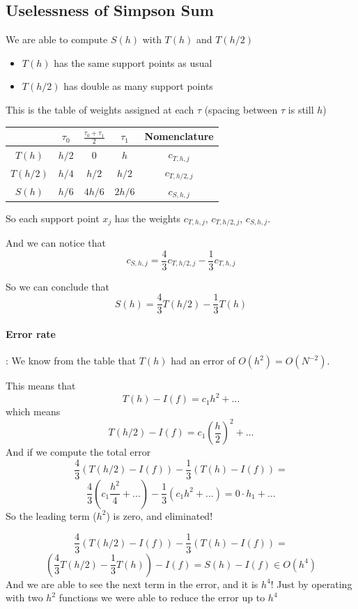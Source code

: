 \documentclass{article}
\begin{document}
\subsection{Uselessness of Simpson Sum}
We are able to compute $S(h)$ with $T(h)$ and $T(h/2)$

\begin{itemize}
  \item $T(h)$ has the same support points as usual
  \item $T(h/2)$ has double as many support points
\end{itemize}
This is the table of weights assigned at each $\tau$ (spacing between $\tau$ is still $h$)
\begin{center}
  \begin{tabular}{|c|c|c|c|c|}
    \hline
     & $\tau_0$ & $\frac{\tau_0 + \tau_1}{2}$ & $\tau_1$ & Nomenclature\\
    \hline
    $T(h)$ & $h/2$ & 0 & $h$ & $c_{T,h,j}$\\
    \hline
    $T(h/2)$ & $h/4$ & $h/2$ & $h/2$ & $c_{T,h/2,j}$ \\
    \hline
    $S(h)$ & $h/6$ & $4h/6$ & $2h/6$ & $c_{S,h,j}$\\
    \hline
  \end{tabular}
\end{center}
So each support point $x_j$ has the weights $c_{T,h,j}$, $c_{T,h/2,j}$, $c_{S,h,j}$.

And we can notice that
\[c_{S,h,j} = \frac{4}{3}c_ {T,h/2,j} - \frac{1}{3}c_{T,h,j}\]


So we can conclude that
\[S(h) = \frac{4}{3}T(h/2) - \frac{1}{3}T(h)\]
\paragraph{Error rate}: We know from the table that $T(h)$ had an error of $O(h^2) = O(N^{-2})$.

This means that
\[T(h)-I(f) = c_1 h^2 + \dots\]
which means
\[T(h/2) - I(f) = c_1 \left(\frac{h}{2}\right)^2 + \dots\]
And if we compute the total error
\[\frac{4}{3}\left(T(h/2) - I(f)\right) - \frac{1}{3}\left(T(h) - I(f)\right) = \]
\[\frac{4}{3}\left(c_1 \frac{h^2}{4}+ ...\right) - \frac{1}{3}\left(c_1h^2 + \dots\right) = 0\cdot h_1 + \dots\]
So the leading term ($h^2$) is zero, and eliminated!

\[\frac{4}{3}\left(T(h/2) - I(f)\right) - \frac{1}{3}\left(T(h) - I(f)\right) = \]
\[\left(\frac{4}{3}T(h/2) - \frac{1}{3}T(h)\right) - I(f) = S(h) - I(f) \in O(h^4)\]
And we are able to see the next term in the error, and it is $h^4$! Just by operating with two $h^2$ functions we were able to reduce the error up to $h^4$
\end{document}
